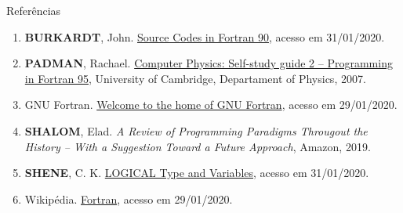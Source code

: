 \begin{frame}[fragile]{Referências}

    \begin{enumerate}
        \item \textbf{BURKARDT}, John. \href{https://people.sc.fsu.edu/~jburkardt/f_src/f_src.html}{Source Codes in Fortran 90}, acesso em 31/01/2020.
 
        \item \textbf{PADMAN}, Rachael. \href{http://www.mrao.cam.ac.uk/~rachael/compphys/SelfStudyF95.pdf}{Computer Physics: Self-study guide 2 -- Programming in Fortran 95}, University of 
        Cambridge, Departament of Physics, 2007.

        \item GNU Fortran. \href{https://gcc.gnu.org/fortran/}{Welcome to the home of GNU Fortran},
            acesso em 29/01/2020.
 
        \item \textbf{SHALOM}, Elad. \textit{A Review of Programming Paradigms Througout the 
            History -- With a Suggestion Toward a Future Approach}, Amazon, 2019.

        \item \textbf{SHENE}, C. K. \href{https://pages.mtu.edu/~shene/COURSES/cs201/NOTES/chap03/log-type.html}{LOGICAL Type and Variables}, acesso em 31/01/2020.

        \item Wikipédia. \href{https://pt.wikipedia.org/wiki/Fortran}{Fortran}, acesso em 
            29/01/2020.
 
    \end{enumerate}

\end{frame}
